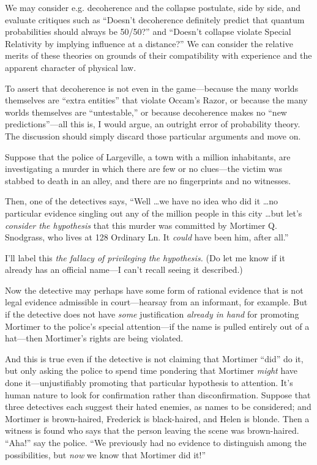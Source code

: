 {
 We may consider e.g. decoherence and the collapse postulate, side
by side, and evaluate critiques such as
``Doesn't decoherence definitely
predict that quantum probabilities should always be
50/50?'' and
``Doesn't collapse violate Special
Relativity by implying influence at a distance?'' We
can consider the relative merits of these theories on grounds of their
compatibility with experience and the apparent character of physical
law.}

{
 To assert that decoherence is not even in the game---because the
many worlds themselves are ``extra
entities'' that violate Occam's
Razor, or because the many worlds themselves are
``untestable,'' or because
decoherence makes no ``new
predictions''---all this is, I would argue, an
outright error of probability theory. The discussion should simply
discard those particular arguments and move on.}

\myendsectiontext


{
 Suppose that the police of Largeville, a town with a million
inhabitants, are investigating a murder in which there are few or no
clues---the victim was stabbed to death in an alley, and there are no
fingerprints and no witnesses. }

{
 Then, one of the detectives says, ``Well \ldots we
have no idea who did it \ldots no particular evidence singling out any
of the million people in this city \ldots but let's
\textit{consider the hypothesis} that this murder was committed by
Mortimer Q. Snodgrass, who lives at 128 Ordinary Ln. It \textit{could}
have been him, after all.''}

{
 I'll label this \textit{the fallacy of privileging
the hypothesis.} (Do let me know if it already has an official name---I
can't recall seeing it described.)}

{
 Now the detective may perhaps have some form of rational evidence
that is not legal evidence admissible in court---hearsay from an
informant, for example. But if the detective does not have
\textit{some} justification \textit{already in hand} for promoting
Mortimer to the police's special attention---if the
name is pulled entirely out of a hat---then Mortimer's
rights are being violated.}

{
 And this is true even if the detective is not claiming that
Mortimer ``did'' do it, but only
asking the police to spend time pondering that Mortimer \textit{might}
have done it---unjustifiably promoting that particular hypothesis to
attention. It's human nature to look for confirmation
rather than disconfirmation. Suppose that three detectives each suggest
their hated enemies, as names to be considered; and Mortimer is
brown-haired, Frederick is black-haired, and Helen is blonde. Then a
witness is found who says that the person leaving the scene was
brown-haired. ``Aha!'' say the
police. ``We previously had no evidence to distinguish
among the possibilities, but \textit{now} we know that Mortimer did
it!''}

